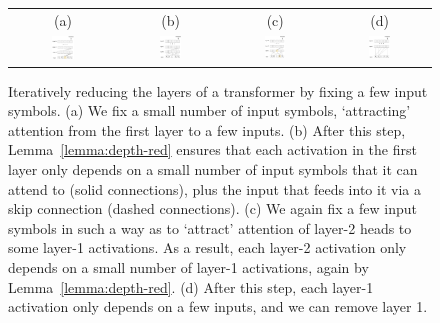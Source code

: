 \documentclass[11pt,a4paper]{article}
\begin{document}
\begin{figure}[ht]
    \centering
    \begin{tabular}{cccc}
    (a) & (b) & (c) & (d) \\
    \includegraphics[width=0.23\textwidth]{figures/sa1_.png} &
        \includegraphics[width=0.23\textwidth]{figures/sa2_b.png}&
    \includegraphics[width=0.22\textwidth]{figures/sa3_b.png} &
        \includegraphics[width=0.23\textwidth]{figures/sa4_b.png}
        \end{tabular}
	\caption{Iteratively reducing the layers of a transformer by fixing a few input symbols. (a) We fix a small number of input symbols, `attracting' attention from the first layer to a few inputs. (b) After this step, Lemma~\ref{lemma:depth-red} ensures that each activation in the first layer only depends on a small number of input symbols that it can attend to (solid connections), plus the input that feeds into it via a skip connection (dashed connections). (c) We again fix a few input symbols in such a way as to `attract' attention of layer-2 heads to some layer-1 activations. As a result, each layer-2 activation only depends on a small number of layer-1 activations, again by Lemma~\ref{lemma:depth-red}. (d) After this step, each layer-1 activation only depends on a few inputs, and we can remove layer 1.
	}
	\label{fig:depth-reduction}
\end{figure}
\end{document}
